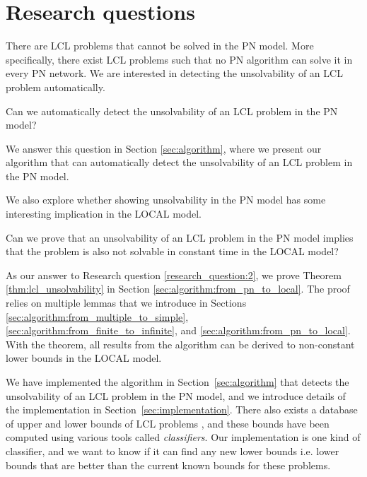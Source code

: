 
\section{Research questions} \label{sec:research_question}

There are LCL problems that cannot be solved in the PN model.
More specifically, there exist LCL problems such that no PN algorithm can solve it in every PN network.
We are interested in detecting the unsolvability of an LCL problem automatically.

\begin{researchquestion} \label{research_question:1}
Can we automatically detect the unsolvability of an LCL problem in the PN model?
\end{researchquestion}

We answer this question in Section \ref{sec:algorithm}, where we present our algorithm that can automatically detect the unsolvability of an LCL problem in the PN model.

We also explore whether showing unsolvability in the PN model has some interesting implication in the LOCAL model.

\begin{researchquestion} \label{research_question:2}
Can we prove that an unsolvability of an LCL problem in the PN model implies that the problem is also not solvable in constant time in the LOCAL model?
\end{researchquestion}

As our answer to Research question \ref{research_question:2}, we prove Theorem \ref{thm:lcl_unsolvability} in Section \ref{sec:algorithm:from_pn_to_local}.
The proof relies on multiple lemmas that we introduce in Sections \ref{sec:algorithm:from_multiple_to_simple}, \ref{sec:algorithm:from_finite_to_infinite}, and \ref{sec:algorithm:from_pn_to_local}.
With the theorem, all results from the algorithm can be derived to non-constant lower bounds in the LOCAL model.

We have implemented the algorithm in Section~\ref{sec:algorithm} that detects the unsolvability of an LCL problem in the PN model, and we introduce details of the implementation in Section~\ref{sec:implementation}.
There also exists a database of upper and lower bounds of LCL problems \cite{Tereshchenko2021}, and these bounds have been computed using various tools called \emph{classifiers}.
Our implementation is one kind of classifier, and we want to know if it can find any new lower bounds i.e. lower bounds that are better than the current known bounds for these problems.

